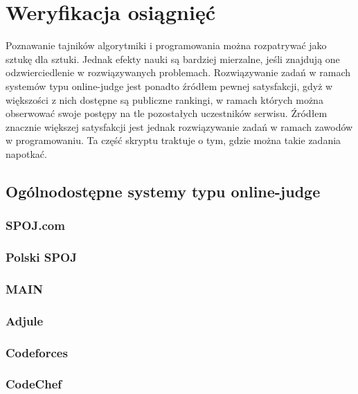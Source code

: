 \section{Weryfikacja osiągnięć}

Poznawanie tajników algorytmiki i programowania można rozpatrywać jako sztukę
dla sztuki. Jednak efekty nauki są bardziej mierzalne, jeśli znajdują one
odzwierciedlenie w rozwiązywanych problemach. Rozwiązywanie zadań w ramach
systemów typu online-judge jest ponadto źródłem pewnej satysfakcji, gdyż
w większości z nich dostępne są publiczne rankingi, w ramach których można
obserwować swoje postępy na tle pozostałych uczestników serwisu. Źródłem
znacznie większej satysfakcji jest jednak rozwiązywanie zadań w ramach
zawodów w programowaniu. Ta część skryptu traktuje o tym, gdzie można takie
zadania napotkać.

\subsection{Ogólnodostępne systemy typu online-judge}

\subsubsection{SPOJ.com}

\subsubsection{Polski SPOJ}

\subsubsection{MAIN}

\subsubsection{Adjule}

\subsubsection{Codeforces}

\subsubsection{CodeChef}

